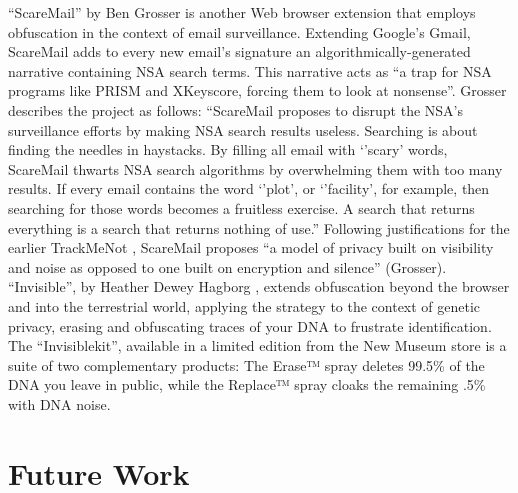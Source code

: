\documentclass[conference]{IEEEtran}
\begin{document}
``ScareMail'' by Ben Grosser \cite{Grosser} is another Web browser extension that employs obfuscation in the context of email surveillance. Extending Google's Gmail, ScareMail adds to every new email's signature an algorithmically-generated narrative containing NSA search terms. This narrative acts as ``a trap for NSA programs like PRISM and XKeyscore, forcing them to look at nonsense''. Grosser describes the project as follows: ``ScareMail proposes to disrupt the NSA's surveillance efforts by making NSA search results useless. Searching is about finding the needles in haystacks. By filling all email with `'scary' words, ScareMail thwarts NSA search algorithms by overwhelming them with too many results. If every email contains the word `'plot', or `'facility', for example, then searching for those words becomes a fruitless exercise. A search that returns everything is a search that returns nothing of use.'' Following justifications for the earlier TrackMeNot \cite{Howe-2}, ScareMail proposes ``a model of privacy built on visibility and noise as opposed to one built on encryption and silence'' (Grosser).
``Invisible'', by Heather Dewey Hagborg \cite{Hagborg}, extends obfuscation beyond the browser and into the terrestrial world, applying the strategy to the context of genetic privacy, erasing and obfuscating traces of your DNA to frustrate identification. The ``Invisiblekit'', available in a limited edition from the New Museum store is a suite of two complementary products: The Erase™ spray deletes 99.5\% of the DNA you leave in public, while the Replace™ spray cloaks the remaining .5\% with DNA noise.

\section{Future Work}
\end{document}
